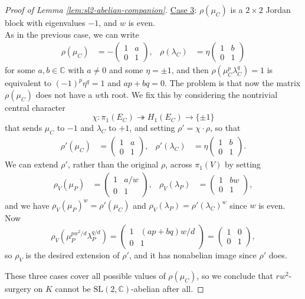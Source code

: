 \documentclass[10pt,a4paper]{amsart}
\newcommand{\C}{\mathbb{C}}
\newcommand\SL{\mathrm{SL}}
\begin{document}
\begin{proof}[Proof of Lemma \ref{lem:sl2-abelian-companion}]
\vspace{1em}\noindent
\underline{Case 3}: $\rho(\mu_C)$ is a $2\times 2$ Jordan block with eigenvalues $-1$, and $w$ is even.\\

As in the previous case, we can write
\begin{align*}
\rho(\mu_C) &= -\begin{pmatrix} 1 & a \\ 0 & 1 \end{pmatrix}, &
\rho(\lambda_C) &= \eta \begin{pmatrix} 1 & b \\ 0 & 1 \end{pmatrix}
\end{align*}
for some $a,b\in\C$ with $a\neq 0$ and some $\eta=\pm1$, and then $\rho(\mu_C^p\lambda_C^q)=1$ is equivalent to $(-1)^p\eta^q=1$ and $ap+bq=0$.  The problem is that now the matrix $\rho(\mu_C)$ does not have a $w$th root.  We fix this by considering the nontrivial central character
\[ \chi: \pi_1(E_C) \twoheadrightarrow H_1(E_C) \to \{\pm1\} \]
that sends $\mu_C$ to $-1$ and $\lambda_C$ to $+1$, and setting $\rho' = \chi\cdot\rho$, so that
\begin{align*}
\rho'(\mu_C) &= \begin{pmatrix} 1 & a \\ 0 & 1 \end{pmatrix}, &
\rho'(\lambda_C) &= \eta \begin{pmatrix} 1 & b \\ 0 & 1 \end{pmatrix}.
\end{align*}
We can extend $\rho'$, rather than the original $\rho$, across $\pi_1(V)$ by setting
\begin{align*}
\rho_V(\mu_P) &= \begin{pmatrix} 1 & a/w \\ 0 & 1 \end{pmatrix}, &
\rho_V(\lambda_P) &= \begin{pmatrix} 1 & bw \\ 0 & 1 \end{pmatrix},
\end{align*}
and we have $\rho_V(\mu_P)^w = \rho'(\mu_C)$ and $\rho_V(\lambda_P) = \rho'(\lambda_C)^w$ since $w$ is even.  Now 
\[ \rho_V(\mu_P^{pw^2/d}\lambda_P^{q/d}) = \begin{pmatrix} 1 & (ap+bq)w/d \\ 0 & 1 \end{pmatrix} = \begin{pmatrix} 1 & 0 \\ 0 & 1 \end{pmatrix}, \]
so $\rho_V$ is the desired extension of $\rho'$, and it has nonabelian image since $\rho'$ does.

\vspace{1em}These three cases cover all possible values of $\rho(\mu_C)$, so we conclude that $rw^2$-surgery on $K$ cannot be $\SL(2,\C)$-abelian after all.
\end{proof}
\end{document}
